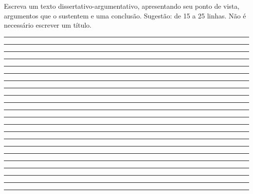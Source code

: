 \documentclass[12pt,a4paper]{article}
\begin{document}
\medskip
\noindent Escreva um texto dissertativo-argumentativo, apresentando seu ponto de vista, argumentos que o sustentem e uma conclusão. Sugestão: de 15 a 25 linhas. Não é necessário escrever um título.

\vspace{0.4cm}
\noindent\rule{\textwidth}{0.3pt}\par\vspace{0.45cm}
\noindent\rule{\textwidth}{0.3pt}\par\vspace{0.5cm}
\noindent\rule{\textwidth}{0.3pt}\par\vspace{0.5cm}
\noindent\rule{\textwidth}{0.3pt}\par\vspace{0.5cm}
\noindent\rule{\textwidth}{0.3pt}\par\vspace{0.5cm}
\noindent\rule{\textwidth}{0.3pt}\par\vspace{0.5cm}
\noindent\rule{\textwidth}{0.3pt}\par\vspace{0.5cm}
\noindent\rule{\textwidth}{0.3pt}\par\vspace{0.5cm}
\noindent\rule{\textwidth}{0.3pt}\par\vspace{0.5cm}
\noindent\rule{\textwidth}{0.3pt}\par\vspace{0.5cm}
\noindent\rule{\textwidth}{0.3pt}\par\vspace{0.5cm}
\noindent\rule{\textwidth}{0.3pt}\par\vspace{0.5cm}
\noindent\rule{\textwidth}{0.3pt}\par\vspace{0.5cm}
\noindent\rule{\textwidth}{0.3pt}\par\vspace{0.5cm}
\noindent\rule{\textwidth}{0.3pt}\par\vspace{0.5cm}
\noindent\rule{\textwidth}{0.3pt}\par\vspace{0.5cm}
\noindent\rule{\textwidth}{0.3pt}\par\vspace{0.5cm}
\noindent\rule{\textwidth}{0.3pt}\par\vspace{0.5cm}
\noindent\rule{\textwidth}{0.3pt}\par\vspace{0.5cm}
\noindent\rule{\textwidth}{0.3pt}\par\vspace{0.5cm}
\noindent\rule{\textwidth}{0.3pt}\par\vspace{0.5cm}
\noindent\rule{\textwidth}{0.3pt}\par
\end{document}
